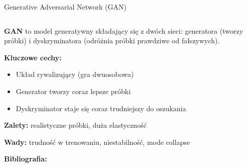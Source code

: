 \documentclass{beamer}
\begin{document}
\begin{frame}{Generative Adversarial Network (GAN)}
  \begin{columns}
    \begin{column}{0.6\textwidth}
    \textbf{GAN} to model generatywny składający się z dwóch sieci: generatora (tworzy próbki) i dyskryminatora (odróżnia próbki prawdziwe od fałszywych).
    
    \medskip
    \textbf{Kluczowe cechy:}
    \begin{itemize}
    \item Układ rywalizujący (gra dwuosobowa)
    \item Generator tworzy coraz lepsze próbki
    \item Dyskryminator staje się coraz trudniejszy do oszukania
    \end{itemize}
    
    \textbf{Zalety:} realistyczne próbki, duża elastyczność
    
    \textbf{Wady:} trudność w trenowaniu, niestabilność, mode collapse
    
    \textbf{Bibliografia:} \cite{goodfellow2014generative}
    \end{column}
    \begin{column}{0.4\textwidth}
    \centering
    \end{column}
  \end{columns}
\end{frame}
\end{document}
